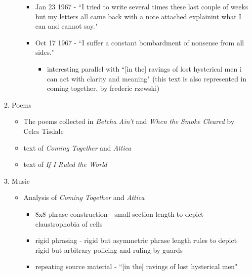 \documentclass[14pt, letterpaper]{report}
\begin{document}
\begin{enumerate}
\begin{itemize}
\begin{itemize}
					\item   Jan 23 1967 - ``I tried to write several times these last couple of weeks 
						but my letters all came back with a note attached explainint what I can and 
						cannot say."\autocite[101]{soledad-brother}

					\item   Oct 17 1967 - ``I suffer a constant bombardment of nonsense from all 
						sides."\autocite[139]{soledad-brother}
						\begin{itemize}
							\item interesting parallel with ``[in the] ravings of lost hysterical
							men i can act with clarity and meaning"\autocite[110]{letters-from-attica}
							(this text is also represented in coming together, by frederic rzewski)\autocite{coming-together}
						\end{itemize} 

				\end{itemize}
		
		\end{itemize}			

		\item   Poems
			\begin{itemize}
				
				\item The poems collected in \textit{Betcha Ain't} and \textit{When the Smoke Cleared} by Celes Tisdale
				
				\item text of \textit{Coming Together} and \textit{Attica}

				\item text of \textit{If I Ruled the World}				
		
			\end{itemize}

		\item   Music
			\begin{itemize}
				\item Analysis of \textit{Coming Together} and \textit{Attica}\autocite{prisoners-voices}
				\begin{itemize}
					\item   8x8 phrase  construction - small section length to depict claustrophobia of cells
					\item   rigid phrasing - rigid but asymmetric phrase length rules to depict rigid but 
						arbitrary policing and ruling by guards
					\item   repeating source material - ``[in the] ravings of lost hysterical men"
				\end{itemize}
				

\end{itemize}
\end{enumerate}
\end{document}
